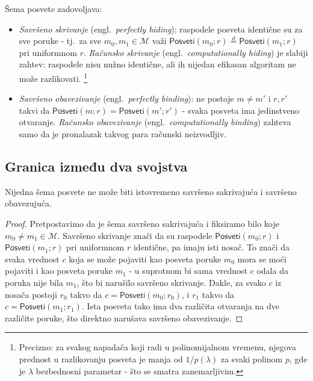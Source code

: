 \begin{definition}
\label{def:hiding-binding}
Šema posvete zadovoljava:
\begin{itemize}
  \item \emph{Savršeno skrivanje} (engl.\ \textit{perfectly hiding}): raspodele posveta
    identične su za sve poruke - tj.\ za sve $m_0, m_1 \in \mathcal{M}$ važi
    $\mathsf{Posveti}(m_0; r) \overset{d}{=} \mathsf{Posveti}(m_1; r)$ pri uniformnom $r$.
    \emph{Računsko skrivanje} (engl.\ \textit{computationally hiding}) je slabiji zahtev:
    raspodele nisu nužno identične, ali ih nijedan efikasan algoritam ne može razlikovati.%
    \footnote{Precizno: za svakog napadača koji radi u polinomijalnom vremenu,
    njegova prednost u razlikovanju posveta je manja od $1/p(\lambda)$ za svaki polinom $p$,
    gde je $\lambda$ bezbednosni parametar - što se smatra zanemarljivim.}

  \item \emph{Savršeno obavezivanje} (engl.\ \textit{perfectly binding}): ne postoje
    $m \neq m'$ i $r, r'$ takvi da $\mathsf{Posveti}(m; r) = \mathsf{Posveti}(m'; r')$ -
    svaka posveta ima jedinstveno otvaranje.
    \emph{Računsko obavezivanje} (engl.\ \textit{computationally binding}) zahteva samo da
    je pronalazak takvog para računski neizvodljiv.
\end{itemize}
\end{definition}

\subsection*{Granica između dva svojstva}

\begin{proposition}
\label{prop:no-perfect-both}
Nijedna šema posvete ne može biti istovremeno savršeno sakrivajuća i savršeno obavezujuća.
\end{proposition}

\begin{proof}
Pretpostavimo da je šema savršeno sakrivajuća i fiksiramo bilo koje $m_0 \neq m_1 \in
\mathcal{M}$. Savršeno skrivanje znači da su raspodele $\mathsf{Posveti}(m_0; r)$ i
$\mathsf{Posveti}(m_1; r)$ pri uniformnom $r$ identične, pa imaju isti nosač. To znači da
svaka vrednost $c$ koja se može pojaviti kao posveta poruke $m_0$ mora se moći pojaviti i
kao posveta poruke $m_1$ - u suprotnom bi sama vrednost $c$ odala da poruka nije bila
$m_1$, što bi narušilo savršeno skrivanje. Dakle, za svako $c$ iz nosača postoji $r_0$
takvo da $c = \mathsf{Posveti}(m_0; r_0)$, i $r_1$ takvo da $c = \mathsf{Posveti}(m_1; r_1)$.
Ista posveta tako ima dva različita otvaranja na dve različite poruke, što direktno
narušava savršeno obavezivanje.
\end{proof}

